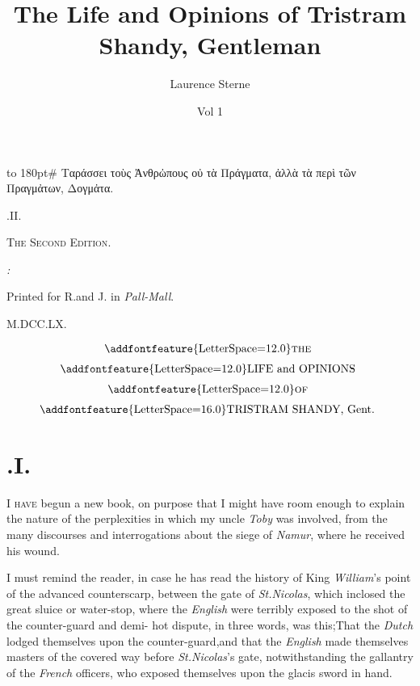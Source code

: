 \documentclass{article}
\title{The Life and Opinions of Tristram Shandy, Gentleman}
\author{Laurence Sterne}
\date{Vol 1}
\begin{document}
\pagestyle{empty}
\vbox{\openup 10pt}
\vfill
\vbox{\openup -2pt\halign to 180pt{\footnotesize #\cr
\quad Ταράσσει τοὺς Ἀνθρὠπους οὐ τὰ Πράγματα,\cr
ἀλλὰ τὰ περὶ τῶν Πραγμἀτων, Δογμἀτα.\hfill\cr}}
\vfill
\centerline{.\quad II.}
\smallskip
\centerline{\textsc{The Second Edition}.}
\vfill
\centerline{\itshape{}:}
\centerline{\smaller Printed for R.\@ and J.\@ {} in \textit{Pall-Mall}.}
\centerline{M.DCC.LX.}
\newpage
\null
\newpage
\pagestyle{fancy}
\thispagestyle{empty}
\setcounter{page}{1}
\[\vbox{\openup 6pt\halign{\hss # \hss\cr
\addfontfeature{LetterSpace=12.0}\textsc{the}\cr
\addfontfeature{LetterSpace=12.0}LIFE and OPINIONS\cr
\addfontfeature{LetterSpace=12.0}\textsc{of}\cr
{\addfontfeature{LetterSpace=16.0}TRISTRAM SHANDY}, Gent.\cr}}\]

\vskip 6pt
\setlength{\baselineskip}{14pt}  %

\section{.\enspace  I.}

\lettrine{I}{ have} begun a new book, on purpose that I might
have room enough to explain the nature of the perplexities in
which my uncle \textit{Toby} was involved, from the many
discourses and interrogations about the siege of \textit{Namur},
where he received his wound.

I must remind the reader, in case he has read the history of
King \textit{William}’s 
point of the advanced counterscarp,
be\-tween the gate of \textit{St.\@ Nicolas}, which inclo\-sed the
great sluice or water-stop, where the \textit{English} were
terribly exposed to the shot of the counter-guard and
demi-\break
{}
hot dispute, in three words, was this;\break That the \textit{Dutch}
lodged themselves upon the counter-guard,\tsk and that the
\textit{English} made themselves masters of the covered way
before \textit{St.\@ Nicolas}'s gate, notwithstanding the gallantry
of the \textit{French} offi\-cers, who exposed themselves upon the\break
glacis sword in hand.
\end{document}
